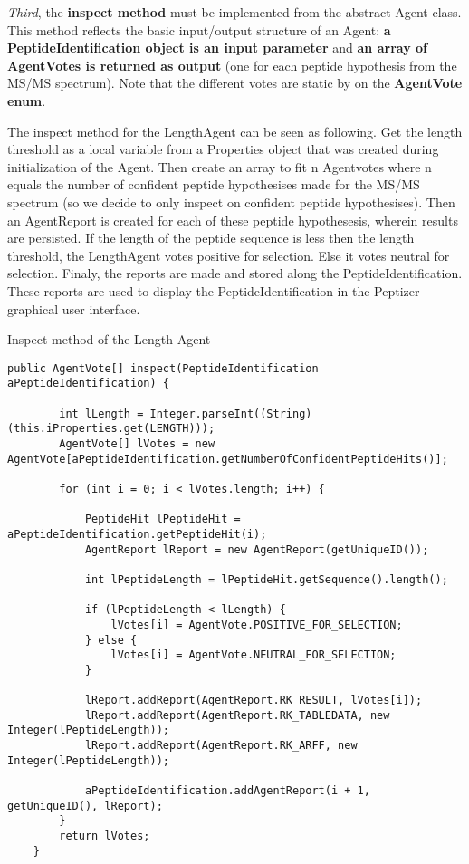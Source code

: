 \npar \textit{Third}, the \textbf{inspect method }must be implemented from the abstract Agent class. This method reflects the basic input/output structure of an Agent: \textbf{a PeptideIdentification object is an input parameter} and \textbf{an array of AgentVotes is returned as output} (one for each peptide hypothesis from the MS/MS spectrum). Note that the different votes are static by on the \textbf{AgentVote enum}.

\npar The inspect method for the LengthAgent can be seen as following. Get the length threshold as a local variable from a Properties object that was created during initialization of the Agent. Then create an array to fit n Agentvotes where n equals the number of confident peptide hypothesises made for the MS/MS spectrum (so we decide to only inspect on confident peptide hypothesises). Then an AgentReport is created  for each of these peptide hypothesesis, wherein results are persisted.
\npar If the length of the peptide sequence is less then the length threshold, the LengthAgent votes positive for selection. Else it votes neutral for selection. Finaly, the reports are made and stored along the PeptideIdentification. These reports are used to display the PeptideIdentification in the Peptizer graphical user interface.

%
%
\begin{algorithm}[H]
\caption{Inspect method of the Length Agent}
\scriptsize
\vspace{0.3cm}
\begin{verbatim}
public AgentVote[] inspect(PeptideIdentification aPeptideIdentification) {

        int lLength = Integer.parseInt((String) (this.iProperties.get(LENGTH)));
        AgentVote[] lVotes = new AgentVote[aPeptideIdentification.getNumberOfConfidentPeptideHits()];

        for (int i = 0; i < lVotes.length; i++) {

	    	PeptideHit lPeptideHit = aPeptideIdentification.getPeptideHit(i);
	   		AgentReport lReport = new AgentReport(getUniqueID());

            int lPeptideLength = lPeptideHit.getSequence().length();

            if (lPeptideLength < lLength) {
                lVotes[i] = AgentVote.POSITIVE_FOR_SELECTION;
            } else {
                lVotes[i] = AgentVote.NEUTRAL_FOR_SELECTION;
            }

            lReport.addReport(AgentReport.RK_RESULT, lVotes[i]);
            lReport.addReport(AgentReport.RK_TABLEDATA, new Integer(lPeptideLength));
            lReport.addReport(AgentReport.RK_ARFF, new Integer(lPeptideLength));

            aPeptideIdentification.addAgentReport(i + 1, getUniqueID(), lReport);
        }
        return lVotes;
    }
\end{verbatim}
\end{algorithm}
%


